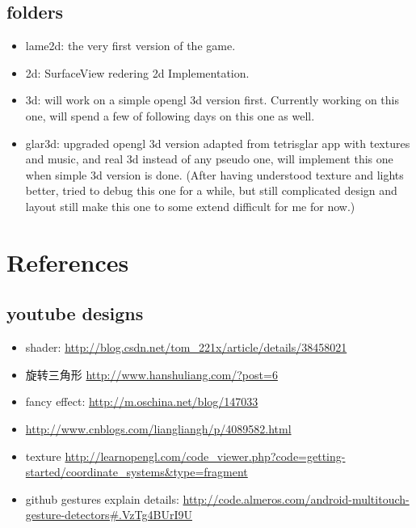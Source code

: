 \documentclass[9pt,b5paper]{article}
\begin{document}
\subsection{folders}
\label{sec-1-2}
\begin{itemize}
\item lame2d: the very first version of the game.
\item 2d: SurfaceView redering 2d Implementation.
\item 3d: will work on a simple opengl 3d version first. Currently working on this one, will spend a few of following days on this one as well.
\item glar3d: upgraded opengl 3d version adapted from tetrisglar app with textures and music, and real 3d instead of any pseudo one, will implement this one when simple 3d version is done. (After having understood texture and lights better, tried to debug this one for a while, but still complicated design and layout still make this one to some extend difficult for me for now.)
\end{itemize}

\section{References}
\label{sec-2}
\subsection{youtube designs}
\label{sec-2-1}
\begin{itemize}
\item shader: \url{http://blog.csdn.net/tom_221x/article/details/38458021}
\item 旋转三角形 \url{http://www.hanshuliang.com/?post=6}
\item fancy effect: \url{http://m.oschina.net/blog/147033}
\item \url{http://www.cnblogs.com/liangliangh/p/4089582.html}
\item texture \url{http://learnopengl.com/code_viewer.php?code=getting-started/coordinate_systems&type=fragment}
\item github gestures explain details: \url{http://code.almeros.com/android-multitouch-gesture-detectors#.VzTg4BUrI9U}
\end{itemize}
\end{document}
